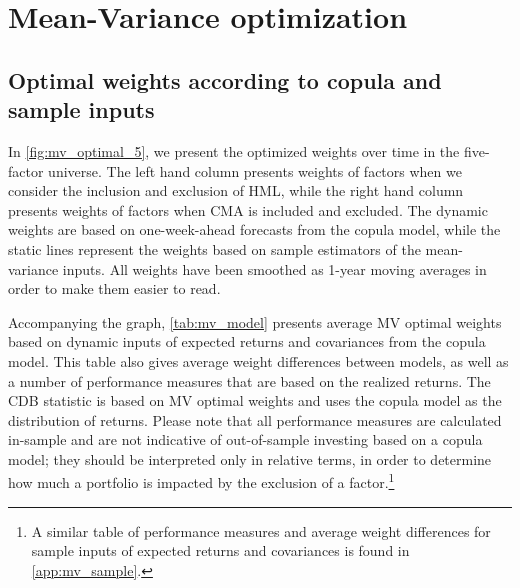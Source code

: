 
\section{Mean-Variance optimization} %
\label{sec:mean_variance}

\subsection{Optimal weights according to copula and sample inputs}

In \autoref{fig:mv_optimal_5}, we present the optimized weights over time in the five-factor universe. The left hand column presents weights of factors when we consider the inclusion and exclusion of HML, while the right hand column presents weights of factors when CMA is included and excluded. The dynamic weights are based on one-week-ahead forecasts from the copula model, while the static lines represent the weights based on sample estimators of the mean-variance inputs. All weights have been smoothed as 1-year moving averages in order to make them easier to read.

Accompanying the graph, \autoref{tab:mv_model} presents average MV optimal weights based on dynamic inputs of expected returns and covariances from the copula model. This table also gives average weight differences between models, as well as a number of performance measures that are based on the realized returns. The CDB statistic is based on MV optimal weights and uses the copula model as the distribution of returns. Please note that all performance measures are calculated in-sample and are not indicative of out-of-sample investing based on a copula model; they should be interpreted only in relative terms, in order to determine how much a portfolio is impacted by the exclusion of a factor.\footnote{A similar table of performance measures and average weight differences for sample inputs of expected returns and covariances is found in \autoref{app:mv_sample}.}


